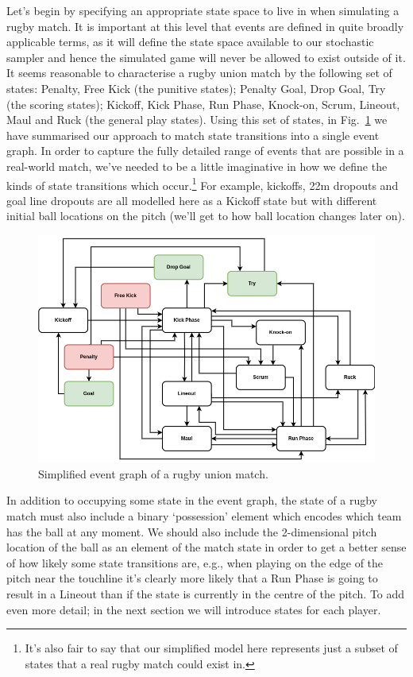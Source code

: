 Let's begin by specifying an appropriate state space to live in when simulating a rugby match. It is important at this level that events are defined in quite broadly applicable terms, as it will define the state space available to our stochastic sampler and hence the simulated game will never be allowed to exist outside of it. It seems reasonable to characterise a rugby union match by the following set of states: {\sf Penalty}, {\sf Free Kick} (the punitive states); {\sf Penalty Goal}, {\sf Drop Goal}, {\sf Try} (the scoring states); {\sf Kickoff}, {\sf Kick Phase}, {\sf Run Phase}, {\sf Knock-on}, {\sf Scrum}, {\sf Lineout}, {\sf Maul} and {\sf Ruck} (the general play states). Using this set of states, in Fig.~\ref{fig:event-graph} we have summarised our approach to match state transitions into a single event graph. In order to capture the fully detailed range of events that are possible in a real-world match, we've needed to be a little imaginative in how we define the kinds of state transitions which occur.\footnote{It's also fair to say that our simplified model here represents just a subset of states that a real rugby match could exist in.} For example, kickoffs, 22m dropouts and goal line dropouts are all modelled here as a {\sf Kickoff} state but with different initial ball locations on the pitch (we'll get to how ball location changes later on).

\begin{figure}[h]
\includegraphics[width=14cm]{images/chapter-11-trywizard-event-graph.drawio.png}
\caption{Simplified event graph of a rugby union match.}
\label{fig:event-graph}
\end{figure}

In addition to occupying some state in the event graph, the state of a rugby match must also include a binary `possession' element which encodes which team has the ball at any moment. We should also include the 2-dimensional pitch location of the ball as an element of the match state in order to get a better sense of how likely some state transitions are, e.g., when playing on the edge of the pitch near the touchline it's clearly more likely that a {\sf Run Phase} is going to result in a {\sf Lineout} than if the state is currently in the centre of the pitch. To add even more detail; in the next section we will introduce states for each player.

